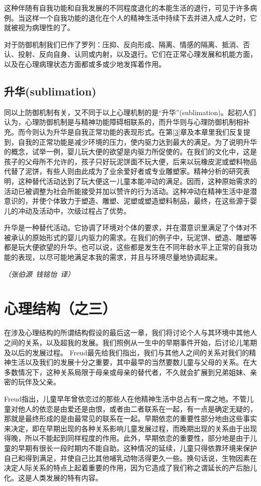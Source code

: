 \documentclass[UTF8,10pt,a4paper,openany]{book}
\newcommand{\signature}[1]{\begin{flushright}\slshape #1\end{flushright}}
\newcommand{\signatureC}{\signature{（张伯源~钱铭怡~译）}}
\begin{document}
这种伴随有自我功能和自我发展的不同程度退化的本能生活的退行，可见于许多病例。当这样一个自我功能的退化在个人的精神生活中持续下去并进入成人之时，它就被视为病理性的了。

对于防御机制我们已作了罗列：压抑、反向形成、隔离、情感的隔离、抵消、否认、投射、反向自身、认同或内射，以及退行。它们在正常心理发展和机能方面，以及在心理病理状态方面都或多或少地发挥着作用。

\section*{升华(sublimation)}
同以上防御机制有关，又不同于以上心理机制的是“升华”(sublimation)。起初人们认为，心理防御机制是与精神功能障碍相联系的，而升华则与心理防御机制相补充。而今则认为升华是自我正常功能的表现形式。在第\ref{3}章及本章里我们反复提到，自我的正常功能是减少环境的压力，使内驱力达到最大的满足。为了说明升华的概念，试举一例，婴儿玩大便的欲望是内驱力所促使的。在我们的文化中，这是孩子的父母所不允许的，孩子只好玩泥饼面不玩大便，后来以玩橡皮泥或塑料物品代替了泥饼，有些人则由此成为了业余爱好者或专业雕塑家。精神分析的研究表明，这种替代活动达到了玩大便这一儿童本能冲动的满足。因而，这种原始需求的活动已被调整为社会所能接受并加以赞许的行为活动。这种冲动在精神生活中是潜意识的，并使个体致力于塑造、雕塑、泥塑或塑造塑料制品，最终，在这些源于婴儿的冲动及活动中，次级过程占了优势。

升华是一种替代活动。它协调了环境对个体的要求，并在潜意识里满足了个体对不被承认的原始形式的婴儿内驱力的需求。在我们的例子中，玩泥饼、塑造、雕塑等都是玩大便欲望的升华。也可以说，这些都是发生在不同年龄水平上正常的自我功能的表现，以尽可能地满足本我的需求，并且与环境尽量地协调起来。

\signatureC



\chapter{心理结构（之三）}\label{5}
在涉及心理结构的所谓结构假设的最后这一章，我们将讨论个人与其环境中其他人之间的关系，以及超我的发展。我们照例从一生中的早期事件开始，后讨论儿笔期及以后的发展过程。
Freud最先给我们指出，我们与其他人之间的关系对我们的精神生活以及我们的发展十分之重要，其中最早的当然要数儿童与父母的关系。在大多数情况下，这种关系局限于母亲或母亲的替代者，不久就会扩展到兄弟姐妹、亲密的玩伴及父亲。

Freud指出，儿童早年曾依恋过的那些人在他精神生活中总占有一席之地。不管儿童对他人的依恋是由爱还是由恨，或者由二者联系在一起，有一点是确定无疑的，那就是最终形成的是由最常见的联系在一起。早期依恋的重要性部分地由这些事实来决定，即在早期出现的各种关系影响儿童发展过程，而晚期出现的关系由于出现得晚，所以不能起到同样程度的作用。此外，早期依恋的重要性，部分地是由于儿童的早期有很长一段时期内不能自助。这种情况的延续，儿童只得依靠环境来保护自己和得到满足，并使自己比其他哺乳动物活得更久一些。换句话说，生物因素在决定人际关系的特点上起着重要的作用，因为它造成了我们称之谓延长的产后胎儿化。这是人类发展的特有内容。
\end{document}
